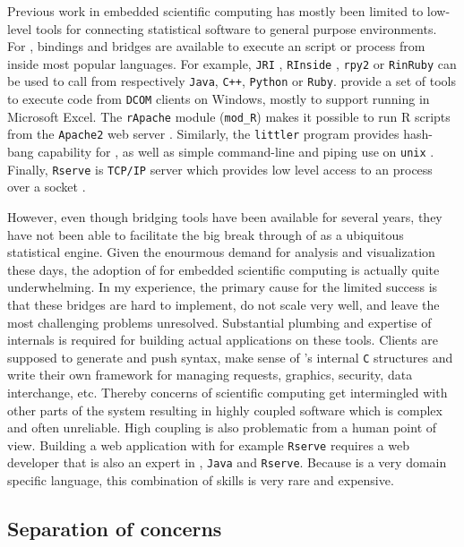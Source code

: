 Previous work in embedded scientific computing has mostly been limited to low-level tools for connecting statistical software to general purpose environments. For \R, bindings and bridges are available to execute an \R script or process from inside most popular languages. For example, \texttt{JRI} \citep{rjava}, \texttt{RInside} \citep{eddelbuettel2011rcpp}, \texttt{rpy2} \citep{gautier2008rpy2} or \texttt{RinRuby} \citep{dahl2008rinruby} can be used to call \R from respectively \texttt{Java}, \texttt{C++}, \texttt{Python} or \texttt{Ruby}. \cite{heiberger2009r} provide a set of tools to execute \R code from \texttt{DCOM} clients on Windows, mostly to support running \R in Microsoft Excel. The \texttt{rApache} module (\texttt{mod\_R}) makes it possible to run R scripts from the \texttt{Apache2} web server \citep{horner2013rapache}. Similarly, the \texttt{littler} program provides hash-bang capability for \R, as well as simple command-line and piping use on \texttt{unix} \citep{littler}. Finally, \texttt{Rserve} is \texttt{TCP/IP} server which provides low level access to an \R process over a socket \citep{urbanek2013rserve}. 

However, even though bridging tools have been available for several years, they have not been able to facilitate the big break through of \R as a ubiquitous statistical engine. Given the enourmous demand for analysis and visualization these days, the adoption of \R for embedded scientific computing is actually quite underwhelming. In my experience, the primary cause for the limited success is that these bridges are hard to implement, do not scale very well, and leave the most challenging problems unresolved. Substantial plumbing and expertise of \R internals is required for building actual applications on these tools. Clients are supposed to generate and push \R syntax, make sense of \R's internal \texttt{C} structures and write their own framework for managing requests, graphics, security, data interchange, etc. Thereby concerns of scientific computing get intermingled with other parts of the system resulting in highly coupled software which is complex and often unreliable. High coupling is also problematic from a human point of view. Building a web application with for example \texttt{Rserve} requires a web developer that is also an expert in \R, \texttt{Java} and \texttt{Rserve}. Because \R is a very domain specific language, this combination of skills is very rare and expensive. 


\subsection{Separation of concerns}

